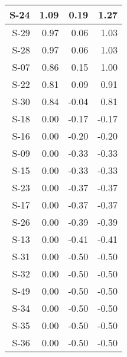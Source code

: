 \begin{tabular}{ | r | r | r | r | }
    \hline
                  S-24  &            1.09  &            0.19  &            1.27  \\
    \hline
                  S-29  &            0.97  &            0.06  &            1.03  \\
    \hline
                  S-28  &            0.97  &            0.06  &            1.03  \\
    \hline
                  S-07  &            0.86  &            0.15  &            1.00  \\
    \hline
                  S-22  &            0.81  &            0.09  &            0.91  \\
    \hline
                  S-30  &            0.84  &           -0.04  &            0.81  \\
    \hline
                  S-18  &            0.00  &           -0.17  &           -0.17  \\
    \hline
                  S-16  &            0.00  &           -0.20  &           -0.20  \\
    \hline
                  S-09  &            0.00  &           -0.33  &           -0.33  \\
    \hline
                  S-15  &            0.00  &           -0.33  &           -0.33  \\
    \hline
                  S-23  &            0.00  &           -0.37  &           -0.37  \\
    \hline
                  S-17  &            0.00  &           -0.37  &           -0.37  \\
    \hline
                  S-26  &            0.00  &           -0.39  &           -0.39  \\
    \hline
                  S-13  &            0.00  &           -0.41  &           -0.41  \\
    \hline
                  S-31  &            0.00  &           -0.50  &           -0.50  \\
    \hline
                  S-32  &            0.00  &           -0.50  &           -0.50  \\
    \hline
                  S-49  &            0.00  &           -0.50  &           -0.50  \\
    \hline
                  S-34  &            0.00  &           -0.50  &           -0.50  \\
    \hline
                  S-35  &            0.00  &           -0.50  &           -0.50  \\
    \hline
                  S-36  &            0.00  &           -0.50  &           -0.50  \\

\end{tabular}
